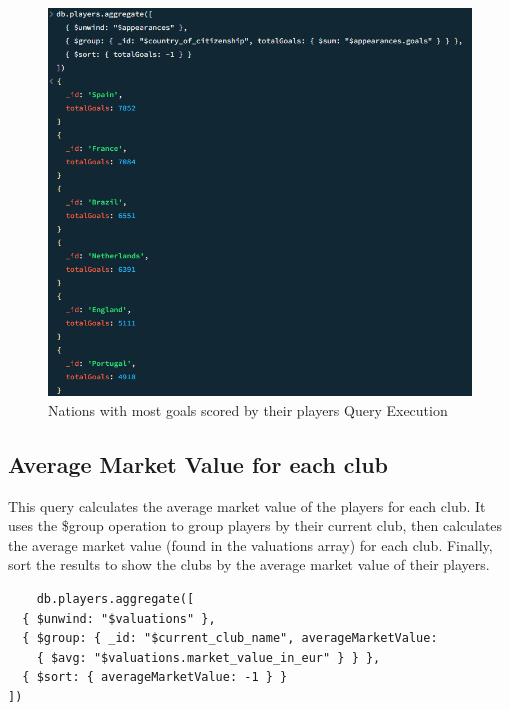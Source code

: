 \documentclass{Configuration_Files/PoliMi3i_thesis}
\begin{document}
\begin{figure}[htbp]
    \centering
    \includegraphics[scale=0.8]{Images/Queries/Nation_goals/ng.png}
    \caption{Nations with most goals scored by their players Query Execution}
\end{figure}

\subsection{Average Market Value for each club}

This query calculates the average market value of the players for each club. It uses the \$group operation to group players by their current club, then calculates the average market value (found in the valuations array) for each club. Finally, sort the results to show the clubs by the average market value of their players.

\begin{verbatim}
    db.players.aggregate([
  { $unwind: "$valuations" },
  { $group: { _id: "$current_club_name", averageMarketValue: 
    { $avg: "$valuations.market_value_in_eur" } } },
  { $sort: { averageMarketValue: -1 } }
])

\end{verbatim}
\end{document}
